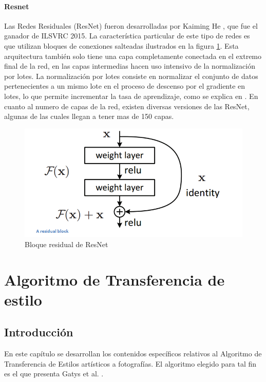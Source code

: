 \documentclass[a4paper,11pt,spanish]{book}
\begin{document}
	\subsubsection{Resnet}
	  Las Redes Residuales (ResNet) fueron desarrolladas por Kaiming He \cite{Kaiming:ResNet}, que fue el ganador de ILSVRC 2015. La característica particular de este tipo de redes 
	  es que utilizan bloques de conexiones salteadas ilustrados en la figura \ref{fig:resnet}. 
	  Esta arquitectura también solo tiene una capa completamente conectada en el extremo final de la red, 
	  en las capas intermedias hacen uso intensivo de la normalización por lotes. La normalización por lotes consiste en normalizar el conjunto de datos pertenecientes
	  a un mismo lote en el proceso de descenso por el gradiente en lotes, lo que permite incrementar la tasa de aprendizaje, como se explica en \cite{BatchNormalization:Ioffe}.
	  En cuanto al numero de capas de la red, existen diversas versiones de las ResNet, algunas de las cuales llegan a tener mas de 150 capas.
	
	  \begin{figure}[h]
	    \begin{center}
	    \includegraphics[width=0.6\linewidth]{./img/resnet_block.png}
	    \end{center}
	    \caption{Bloque residual de ResNet}
	    \label{fig:resnet}
	  \end{figure}	

\chapter{Algoritmo de Transferencia de estilo} \label{chapter:style_transfer}
    \section{Introducción}
      En este capítulo se desarrollan los contenidos específicos relativos al Algoritmo de Transferencia de Estilos artísticos a fotografías. 
      El algoritmo elegido para tal fin es el que presenta Gatys et al. \cite{Gatys:Neural_Style}. 
      
\end{document}
